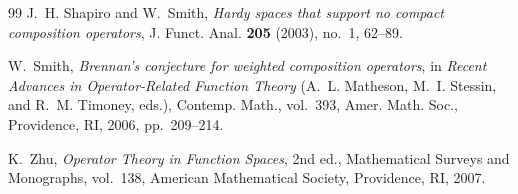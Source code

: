 \documentclass[12pt]{article}
\theoremstyle{definition}
\numberwithin{equation}{section}
\begin{document}
\begin{thebibliography}{99}
J.~H. Shapiro and W.~Smith, \emph{Hardy spaces that support no compact composition operators}, J. Funct. Anal. \textbf{205} (2003), no.~1, 62--89.

W.~Smith, \emph{Brennan's conjecture for weighted composition operators}, in \emph{Recent Advances in Operator-Related Function Theory} (A.~L. Matheson, M.~I. Stessin, and R.~M. Timoney, eds.), Contemp. Math., vol.~393, Amer. Math. Soc., Providence, RI, 2006, pp.~209--214.

K.~Zhu, \emph{Operator Theory in Function Spaces}, 2nd ed., Mathematical Surveys and Monographs, vol.~138, American Mathematical Society, Providence, RI, 2007.

\end{thebibliography}
\end{document}
